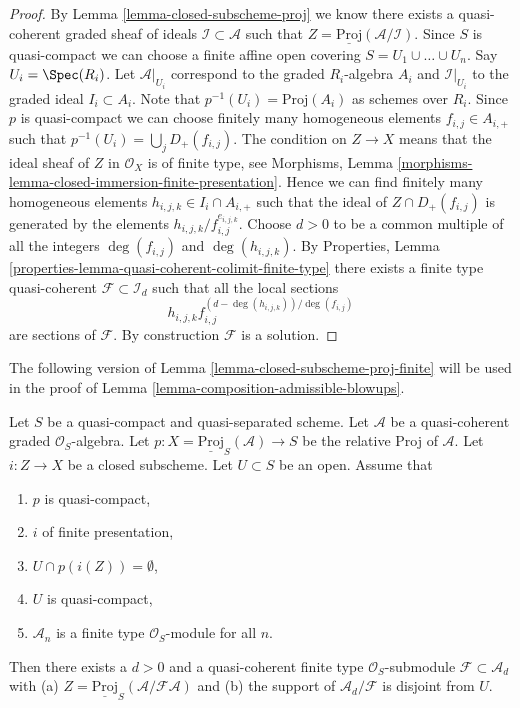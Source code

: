 \begin{proof}
By Lemma \ref{lemma-closed-subscheme-proj} we know there exists a
quasi-coherent graded sheaf of ideals $\mathcal{I} \subset \mathcal{A}$
such that $Z = \underline{\text{Proj}}(\mathcal{A}/\mathcal{I})$.
Since $S$ is quasi-compact we can choose a finite affine open covering
$S = U_1 \cup \ldots \cup U_n$. Say $U_i = \Spec(R_i)$. Let
$\mathcal{A}|_{U_i}$ correspond to the graded $R_i$-algebra $A_i$ and
$\mathcal{I}|_{U_i}$ to the graded ideal $I_i \subset A_i$. Note that
$p^{-1}(U_i) = \text{Proj}(A_i)$ as schemes over $R_i$.
Since $p$ is quasi-compact we can choose finitely many homogeneous
elements $f_{i, j} \in A_{i, +}$ such that
$p^{-1}(U_i) = \bigcup_j D_{+}(f_{i, j})$.
The condition on $Z \to X$ means that the ideal sheaf of $Z$ in
$\mathcal{O}_X$ is of finite type, see
Morphisms, Lemma \ref{morphisms-lemma-closed-immersion-finite-presentation}.
Hence we can find finitely many homogeneous elements
$h_{i, j, k} \in I_i \cap A_{i, +}$ such that the ideal of
$Z \cap D_{+}(f_{i, j})$ is generated by the elements
$h_{i, j, k}/f_{i, j}^{e_{i, j, k}}$. Choose $d > 0$ to be a common multiple
of all the integers $\deg(f_{i, j})$ and $\deg(h_{i, j, k})$.
By Properties, Lemma \ref{properties-lemma-quasi-coherent-colimit-finite-type}
there exists a finite type quasi-coherent $\mathcal{F} \subset \mathcal{I}_d$
such that all the local sections
$$
h_{i, j, k}f_{i, j}^{(d - \deg(h_{i, j, k}))/\deg(f_{i, j})}
$$
are sections of $\mathcal{F}$. By construction $\mathcal{F}$ is a solution.
\end{proof}

\noindent
The following version of Lemma \ref{lemma-closed-subscheme-proj-finite}
will be used in the proof of
Lemma \ref{lemma-composition-admissible-blowups}.

\begin{lemma}
\label{lemma-closed-subscheme-proj-finite-type}
Let $S$ be a quasi-compact and quasi-separated scheme.
Let $\mathcal{A}$ be a quasi-coherent graded $\mathcal{O}_S$-algebra.
Let $p : X = \underline{\text{Proj}}_S(\mathcal{A}) \to S$ be the relative
Proj of $\mathcal{A}$. Let $i : Z \to X$ be a closed subscheme.
Let $U \subset S$ be an open. Assume that
\begin{enumerate}
\item $p$ is quasi-compact,
\item $i$ of finite presentation,
\item $U \cap p(i(Z)) = \emptyset$,
\item $U$ is quasi-compact,
\item $\mathcal{A}_n$ is a finite type $\mathcal{O}_S$-module for all $n$.
\end{enumerate}
Then there exists a $d > 0$ and a quasi-coherent finite type
$\mathcal{O}_S$-submodule $\mathcal{F} \subset \mathcal{A}_d$ with (a)
$Z = \underline{\text{Proj}}_S(\mathcal{A}/\mathcal{F}\mathcal{A})$
and (b) the support of $\mathcal{A}_d/\mathcal{F}$ is disjoint from $U$.
\end{lemma}

